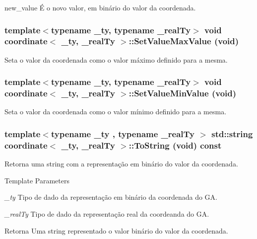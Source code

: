 new\_\-value É o novo valor, em binário do valor da coordenada. \hypertarget{classcoordinate_a552fb17fcf9a6d74c972020d21e99709}{
\subsubsection[{SetValueMaxValue}]{\setlength{\rightskip}{0pt plus 5cm}template$<$typename \_\-ty, typename \_\-realTy$>$ void {\bf coordinate}$<$ \_\-ty, \_\-realTy $>$::SetValueMaxValue (void)}}
\label{classcoordinate_a552fb17fcf9a6d74c972020d21e99709}
Seta o valor da coordenada como o valor máximo definido para a mesma. \hypertarget{classcoordinate_a33a2b235424b34d89e42422c05adc276}{
\subsubsection[{SetValueMinValue}]{\setlength{\rightskip}{0pt plus 5cm}template$<$typename \_\-ty, typename \_\-realTy$>$ void {\bf coordinate}$<$ \_\-ty, \_\-realTy $>$::SetValueMinValue (void)}}
\label{classcoordinate_a33a2b235424b34d89e42422c05adc276}
Seta o valor da coordenada como o valor mínimo definido para a mesma. \hypertarget{classcoordinate_ae7277b9648c716a4ff6f16c15c26433d}{
\subsubsection[{ToString}]{\setlength{\rightskip}{0pt plus 5cm}template$<$typename \_\-ty , typename \_\-realTy $>$ std::string {\bf coordinate}$<$ \_\-ty, \_\-realTy $>$::ToString (void) const}}
\label{classcoordinate_ae7277b9648c716a4ff6f16c15c26433d}
Retorna uma string com a representação em binário do valor da coordenada.


\begin{DoxyTemplParams}{Template Parameters}
\item[{\em \_\-ty}]Tipo de dado da representação em binário da coordenada do GA. \item[{\em \_\-realTy}]Tipo de dado da representação real da coordeanda do GA.\end{DoxyTemplParams}
\begin{DoxyReturn}{Retorna}
Uma string representado o valor binário do valor da coordenada. 
\end{DoxyReturn}



